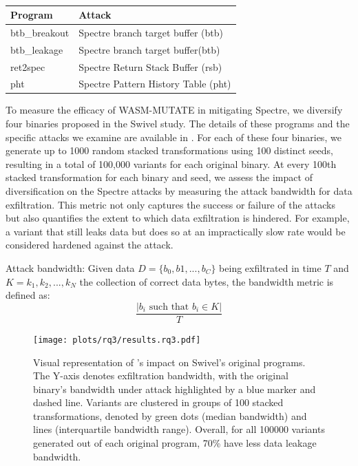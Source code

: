 \begin{table}
    \centering
    \begin{tabular}{l | l  }
        \hline
         Program &  Attack  \\
        \hline \hline
        btb\_breakout & Spectre branch target buffer (btb)  \\
        \hline
         btb\_leakage & Spectre branch target buffer(btb)  \\
        \hline
         ret2spec &  Spectre Return Stack Buffer (rsb)  \\
        \hline
        pht &  Spectre Pattern History Table (pht)  \\

    \end{tabular}
    \caption{}
    \label{programs}
\end{table}

To measure the efficacy of WASM-MUTATE in mitigating Spectre, we diversify four \Wasm binaries proposed in the Swivel study. 
The details of these programs and the specific attacks we examine are available in \cite{programs}. 
For each of these four binaries, we generate up to 1000 random stacked transformations using 100 distinct seeds, resulting in a total of 100,000 variants for each original binary. 
At every 100th stacked transformation for each binary and seed, we assess the impact of diversification on the Spectre attacks by measuring the attack bandwidth for data exfiltration. 
This metric not only captures the success or failure of the attacks but also quantifies the extent to which data exfiltration is hindered. 
For example, a variant that still leaks data but does so at an impractically slow rate would be considered hardened against the attack.

\begin{definition}{Attack bandwidth:}\label{metric:ber}
    Given data $D=\{b_0, b1, ..., b_C\}$ being exfiltrated in time $T$ and $K = {k_1, k_2, ..., k_N}$ the collection of correct data bytes, the bandwidth metric is defined as:
    $$
        \frac{|b_i\text{ such that } b_i \in K|}{T}
    $$
\end{definition}




\begin{figure}
    \centering
    \texttt{[image: plots/rq3/results.rq3.pdf]}
    \caption{Visual representation of \tool's impact on Swivel's original programs. The Y-axis denotes exfiltration bandwidth, with the original binary's bandwidth under attack highlighted by a blue marker and dashed line. Variants are clustered in groups of 100 stacked transformations, denoted by green dots (median bandwidth) and lines (interquartile bandwidth range). Overall, for all 100000 variants generated out of each original program, 70\% have less data leakage bandwidth.}
  \label{attacks:impact}
\end{figure}

